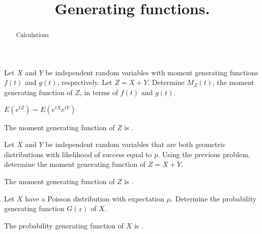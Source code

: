 \documentclass{ximera}
\title{Generating functions.}
\begin{document}
\begin{abstract}
Calculations
\end{abstract}
\maketitle

\begin{question} 
Let $X$ and $Y$ be independent random variables with moment generating functions $f(t)$ and $g(t)$, respectively. Let $Z=X+Y$. Determine $M_{Z}(t)$, the moment generating function of $Z$, in terms of $f(t)$ and $g(t)$. 
     \begin{hint}
          $E(e^{tZ}) = E(e^{tX}e^{tY})$
     \end{hint}
     \begin{solution}
          The moment generating function of $Z$ is .
     \end{solution}
\end{question}

\begin{question}
Let $X$ and $Y$ be independent random variables that are both geometric distributions with likelihood of success equal to $p$. Using the previous problem, determine the moment generating function of $Z=X+Y$. 
     \begin{solution}
          The moment generating function of $Z$ is .
     \end{solution}
\end{question}

\begin{question}
Let $X$ have a Poisson distribution with expectation $\mu$. Determine the probability generating function $G(z)$ of $X$.
     \begin{solution}
          The probability generating function of $X$ is .
     \end{solution}
\end{question}
\end{document}
